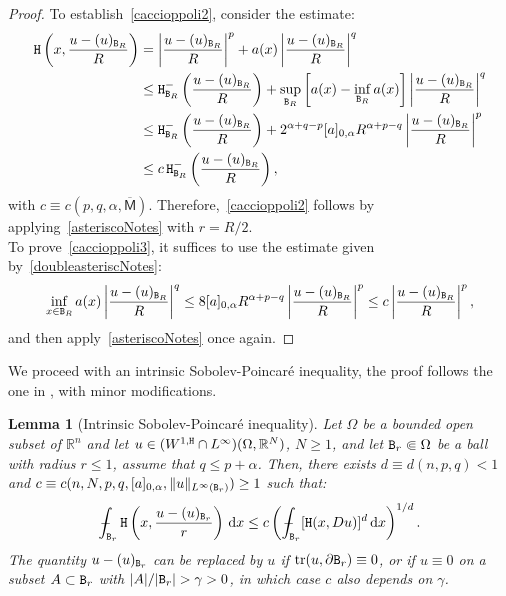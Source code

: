 \documentclass[a4paper]{amsart}
\newtheorem{lemma}[theorem]{Lemma}
\theoremstyle{plain}  %
\numberwithin{equation}{section}
\newcommand{\mint}{\mathop{\int\hskip -1,05em -\, \!\!\!}\nolimits}
\newcommand{\R}{\mathbb{R}}
\newcommand{\dd}{\mathrm{d}}
\newcommand{\mm}{\mathsf{M}}
\newcommand{\tx}[1]{\textnormal{\texttt{#1}}}
\begin{document}
\begin{proof}
\noindent To establish~\eqref{caccioppoli2}, consider the estimate:
\begin{align*}
    \tx{H}\left(x, \frac{u - (u)_{\tx{B}_R}}{R}\right) 
    &= \left| \frac{u - (u)_{\tx{B}_R}}{R} \right|^p + a(x) \left| \frac{u - (u)_{\tx{B}_R}}{R} \right|^q \\
    &\leq \tx{H}^-_{\tx{B}_R}\left( \frac{u - (u)_{\tx{B}_R}}{R} \right) + \sup_{\tx{B}_R} \left[a(x) - \inf_{\tx{B}_R} a(x)\right] \left| \frac{u - (u)_{\tx{B}_R}}{R} \right|^q \\
    &\leq \tx{H}^-_{\tx{B}_R}\left( \frac{u - (u)_{\tx{B}_R}}{R} \right) + 2^{\alpha + q - p} [a]_{0,\alpha} R^{\alpha + p - q} \left| \frac{u - (u)_{\tx{B}_R}}{R} \right|^p \\
    &\leq c \, \tx{H}^-_{\tx{B}_R}\left( \frac{u - (u)_{\tx{B}_R}}{R} \right),
\end{align*}
with \( c \equiv c(p, q, \alpha,\overline{\mm}) \). Therefore,~\eqref{caccioppoli2} follows by applying~\eqref{asteriscoNotes} with \( r = R/2 \).\\

\noindent To prove~\eqref{caccioppoli3}, it suffices to use the estimate given by~\eqref{doubleasteriscNotes}:
\begin{align*}
    \inf_{x \in \tx{B}_R} a(x) \left| \frac{u - (u)_{\tx{B}_R}}{R} \right|^q 
    \leq 8 [a]_{0,\alpha} R^{\alpha + p - q} \left| \frac{u - (u)_{\tx{B}_R}}{R} \right|^p 
    \leq c \left| \frac{u - (u)_{\tx{B}_R}}{R} \right|^p,
\end{align*}
and then apply~\eqref{asteriscoNotes} once again.

\end{proof}
\noindent
We proceed with an intrinsic Sobolev-Poincaré inequality, the proof follows the one in \cite[Section 4]{comi2}, with minor modifications.
\begin{lemma}[Intrinsic Sobolev-Poincaré inequality]\label{IS-Pineq}
  Let $\Omega$ be a  bounded open subset of $\R^n$ and let $u \in (W^{1,\tx{H}} \cap L^{\infty})(\Omega, \mathbb{R}^N)$, $N \geq 1$, and let $\tx{B}_r \Subset \Omega$ be a ball with radius $r \leq 1$, assume that $q \leq p + \alpha$. Then, there exists $d \equiv d(n,p,q) < 1$ and $c \equiv c(n,N,p,q,[a]_{0,\alpha}, \|u\|_{L^{\infty}(\tx{B}_r)}) \geq 1$ such that:
\begin{equation}\label{sun}
\mint_{\tx{B}_r} \tx{H} \left( x, \frac{u - (u)_{\tx{B}_r}}{r} \right)\, \dd x \leq c \left( \mint_{\tx{B}_r} [\tx{H}(x,Du)]^d \, \dd x \right)^{1/d}.
\end{equation}
The quantity $u - (u)_{\tx{B}_r}$ can be replaced by $u$ if $\operatorname{tr}(u, \partial \tx{B}_r) \equiv 0$, or if $u \equiv 0$ on a subset $A \subset \tx{B}_r$ with $|A|/|\tx{B}_r| > \gamma > 0$, in which case $c$ also depends on $\gamma$.
\end{lemma}
\end{document}
